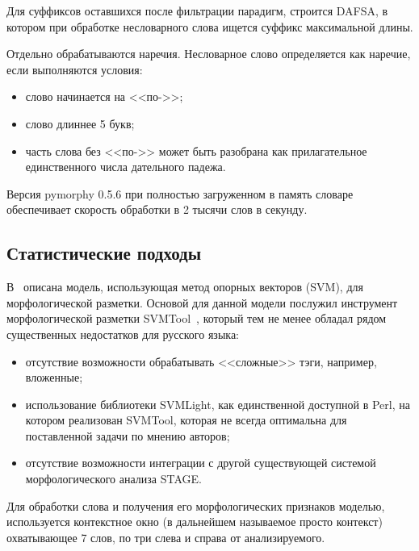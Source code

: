 Для суффиксов оставшихся после фильтрации парадигм, строится DAFSA, в котором при обработке несловарного слова ищется суффикс максимальной длины.

Отдельно обрабатываются наречия. Несловарное слово определяется как наречие, если выполняются условия:
\begin{itemize}
	\item слово начинается на <<по->>;
	\item слово длиннее 5 букв;
	\item часть слова без <<по->> может быть разобрана как прилагательное единственного числа дательного падежа.
\end{itemize}

Версия pymorphy 0.5.6 при полностью загруженном в память словаре обеспечивает скорость обработки в 2 тысячи слов в секунду.

\subsection{Статистические подходы}

В~\cite{Petrochenkov2013} описана модель, использующая метод опорных векторов (SVM), для морфологической разметки. Основой для данной модели послужил инструмент морфологической разметки SVMTool~\cite{GimenezMarquez2004}, который тем не менее обладал рядом существенных недостатков для русского языка:
\begin{itemize}
	\item отсутствие возможности обрабатывать <<сложные>> тэги, например, вложенные;
	\item использование библиотеки SVMLight, как единственной доступной в Perl, на котором реализован SVMTool, которая не всегда оптимальна для поставленной задачи по мнению авторов;
	\item отсутствие возможности интеграции с другой существующей системой морфологического анализа STAGE.
\end{itemize}

Для обработки слова и получения его морфологических признаков моделью, используется контекстное окно (в дальнейшем называемое просто контекст) охватывающее 7 слов, по три слева и справа от анализируемого.

